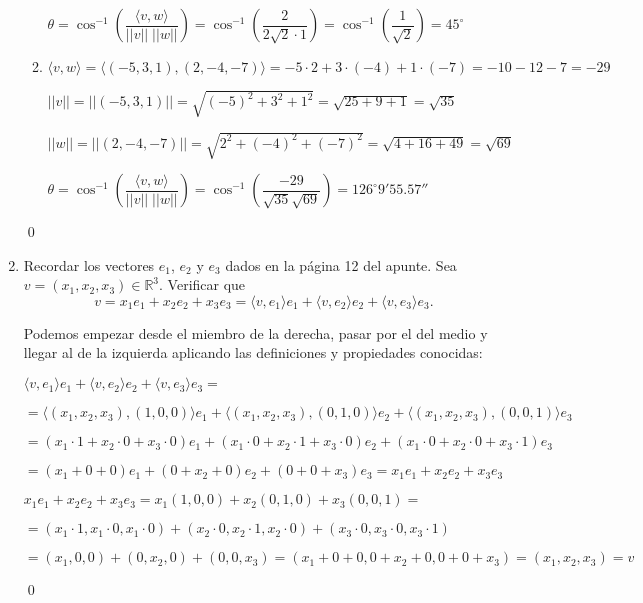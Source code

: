 \begin{enumerate}[topsep=6pt, itemsep=.4cm]
\begin{enumerate}
$\theta = \cos^{-1} \left( \dfrac{\langle v,w \rangle}{||v|| \; ||w||} \right) = \cos^{-1} \left( \dfrac{ 2 }{2\sqrt{2} \cdot 1 } \right) = \cos^{-1} \left( \dfrac{ 1 }{\sqrt{2}} \right) = \boxed{45^\circ}$

\item $\langle v , w  \rangle = \langle (-5,3,1) , (2,-4,-7)  \rangle = -5 \cdot 2 + 3 \cdot (-4) + 1 \cdot (-7) = -10 -12-7 = \boxed{-29}$

$||v||=||(-5,3,1)|| = \sqrt{(-5)^2 + 3^2 + 1^2} = \sqrt{25+9+1} = \sqrt{35}$

$||w||=||(2,-4,-7)|| = \sqrt{2^2 + (-4)^2 + (-7)^2} = \sqrt{4+16+49} = \sqrt{69}$

$\theta = \cos^{-1} \left( \dfrac{\langle v,w \rangle}{||v|| \; ||w||} \right) = \cos^{-1} \left( \dfrac{ -29 }{ \sqrt{35} \sqrt{69} } \right) = \boxed{126^\circ 9'55.57''}$
\end{enumerate}

\qed

\item Recordar los vectores $e_1$, $e_2$ y $e_3$ dados en la página 12 del apunte. Sea $v=(x_1,x_2,x_3)\in\mathbb{R}^3$.  Verificar que 
$$v=x_1e_1+x_2e_2+x_3e_3=\langle v,e_1\rangle e_1+\langle v,e_2\rangle e_2+\langle v,e_3\rangle e_3.$$

\rta Podemos empezar desde el miembro de la derecha, pasar por el del medio y llegar al de la izquierda aplicando las definiciones y propiedades conocidas:

$ \langle v,e_1\rangle e_1+\langle v,e_2\rangle e_2+\langle v,e_3\rangle e_3 = $

$= \langle (x_1,x_2,x_3),(1,0,0)\rangle e_1+\langle (x_1,x_2,x_3),(0,1,0)\rangle e_2+\langle (x_1,x_2,x_3),(0,0,1)\rangle e_3 $

$= (x_1 \cdot 1 + x_2 \cdot 0 + x_3 \cdot 0) e_1+ (x_1 \cdot 0 + x_2 \cdot 1 + x_3 \cdot 0) e_2+ (x_1 \cdot 0 + x_2 \cdot 0 + x_3 \cdot 1) e_3 $

$= (x_1 + 0 + 0) e_1+ (0 + x_2 + 0) e_2+ (0 + 0 + x_3) e_3 = \boxed{x_1 e_1+ x_2 e_2 + x_3 e_3}$

$x_1 e_1+ x_2 e_2 + x_3 e_3 = x_1 (1,0,0) + x_2 (0,1,0) + x_3 (0,0,1) = $

$= (x_1 \cdot 1,x_1 \cdot 0,x_1 \cdot 0) + (x_2 \cdot 0, x_2 \cdot 1 , x_2 \cdot 0 ) + (x_3 \cdot 0 , x_3 \cdot 0 , x_3 \cdot 1) $

$= (x_1,0,0)+(0,x_2,0)+(0,0,x_3) = (x_1+0+0,0+x_2+0,0+0+x_3) = (x_1,x_2,x_3) = \boxed{v}$

\qed


\end{enumerate}
